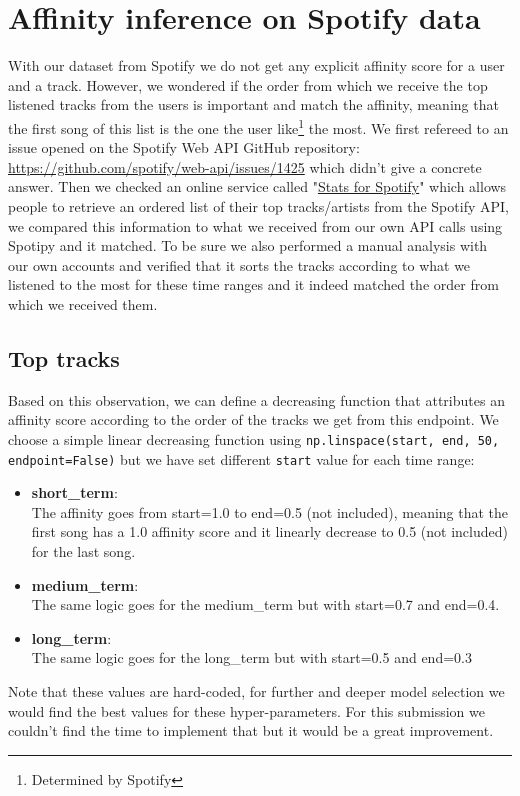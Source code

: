 \chapter{Affinity inference on Spotify data} \label{chap:affinity}
With our dataset from Spotify we do not get any explicit affinity score for a user and a track. However, we wondered if the order from which we receive the top listened tracks from the users is important and match the affinity, meaning that the first song of this list is the one the user like\footnote{Determined by Spotify} the most. We first refereed to an issue opened on the Spotify Web API GitHub repository: \url{https://github.com/spotify/web-api/issues/1425} which didn't give a concrete answer. Then we checked an online service called "\href{https://www.statsforspotify.com}{Stats for Spotify}" which allows people to retrieve an ordered list of their top tracks/artists from the Spotify API, we compared this information to what we received from our own API calls using Spotipy and it matched. To be sure we also performed a manual analysis with our own accounts and verified that it sorts the tracks according to what we listened to the most for these time ranges and it indeed matched the order from which we received them.

\section{Top tracks} \label{subsection:top_tracks}
Based on this observation, we can define a decreasing function that attributes an affinity score according to the order of the tracks we get from this endpoint. We choose a simple linear decreasing function using \texttt{np.linspace(start, end, 50, endpoint=False)} but we have set different \texttt{start} value for each time range:
\begin{itemize}
    \item \textbf{short\_term}:\\
    The affinity goes from start=1.0 to end=0.5 (not included), meaning that the first song has a 1.0 affinity score and it linearly decrease to 0.5 (not included) for the last song.
    \item \textbf{medium\_term}:\\
    The same logic goes for the medium\_term but with start=0.7 and end=0.4.
    \item \textbf{long\_term}:\\
    The same logic goes for the long\_term but with start=0.5 and end=0.3
\end{itemize}
Note that these values are hard-coded, for further and deeper model selection we would find the best values for these hyper-parameters. For this submission we couldn't find the time to implement that but it would be a great improvement.


